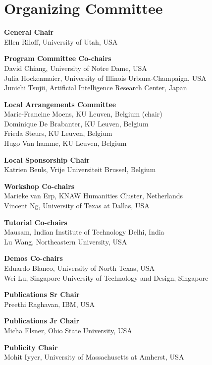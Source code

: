 \markboth{}{} %
\markright{}{} %

\section{Organizing Committee}

\setlength{\parindent}{0pt}

{\bf General Chair} \\
Ellen Riloff, University of Utah, USA       


{\bf Program Committee Co-chairs} \\
David Chiang, University of Notre Dame, USA \\
Julia Hockenmaier, University of Illinois Urbana-Champaign, USA \\
Junichi Tsujii, Artificial Intelligence Research Center, Japan

{\bf Local Arrangements Committee} \\
Marie-Francine Moens, KU Leuven, Belgium (chair) \\
Dominique De Brabanter, KU Leuven, Belgium \\
Frieda Steurs, KU Leuven, Belgium \\
Hugo Van hamme, KU Leuven, Belgium

{\bf Local Sponsorship Chair} \\
Katrien Beuls, Vrije Universiteit Brussel, Belgium
        

{\bf Workshop Co-chairs} \\
Marieke van Erp, KNAW Humanities Cluster, Netherlands \\
Vincent Ng, University of Texas at Dallas, USA


{\bf Tutorial Co-chairs} \\
Mausam, Indian Institute of Technology Delhi, India \\
Lu Wang, Northeastern University, USA

{\bf Demos Co-chairs} \\
Eduardo Blanco, University of North Texas, USA \\
Wei Lu, Singapore University of Technology and Design, Singapore

{\bf Publications Sr Chair} \\
Preethi Raghavan, IBM, USA


{\bf Publications Jr Chair} \\
Micha Elsner, Ohio State University, USA 


{\bf Publicity Chair}\\
Mohit Iyyer, University of Massachusetts at Amherst, USA

